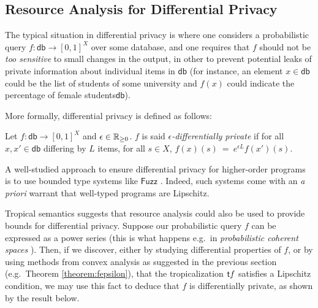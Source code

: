 

\subsection{Resource Analysis for Differential Privacy}

The typical situation in differential privacy is where one considers a probabilistic query $f: \mathsf{db}\to [0,1]^{X}$ over some database, and one requires that $f$ should not be \emph{too sensitive} to small changes in the output, in other to prevent potential leaks of private information about individual items in $\mathsf{db}$ (for instance, an element $x\in\mathsf{db}$ could be the list of students of some university and $f(x)$ could indicate the percentage of female students$\mathsf{db}$).

More formally, differential privacy is defined as follows:
\begin{definition}
Let $f: \mathsf{db}\to [0,1]^{X}$ and $\epsilon \in \mathbb{R}_{\geq 0}$. $f$ is said \emph{$\epsilon$-differentially private} if for all $x,x'\in \mathsf{db}$
differing by $L$ items, for all $s\in X$, 
$
f(x)(s) \ = \ e^{\epsilon L} f(x')(s)
$.
\end{definition}

A well-studied approach to ensure differential privacy for higher-order programs is to use bounded type systems like $\mathsf{Fuzz}$ \cite{Reed2010}. Indeed, such systems come with an \emph{a priori} warrant that well-typed programs are Lipschitz.

Tropical semantics suggests that resource analysis could also be used to provide bounds for differential privacy. 
Suppose our probabilistic query $f$ can be expressed as a power series (this is what happens e.g.~in \emph{probabilistic coherent spaces} \cite{Ehrhard2011}). Then, if we discover, either by studying differential properties of $f$, or by using methods from convex analysis as suggested in the previous section (e.g.~Theorem \ref{theorem:fepsilon}), 
 that the tropicalization $\mathsf{t} f$ satisfies a Lipschitz condition, we may use this fact to deduce that $f$ is differentially private, as shown by the result below.

%
%

